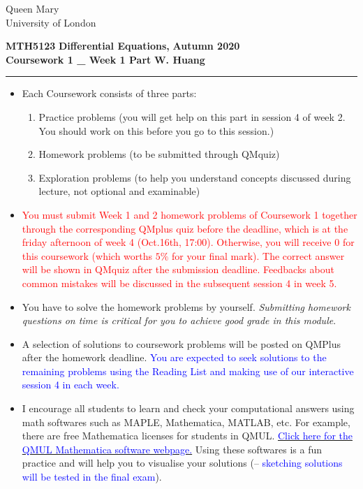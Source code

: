 \documentclass[11pt,a4paper,twoside]{article}
\begin{document}
	\begin{singlespace}
		\begin{center}
			\Huge Queen Mary\\
			\LARGE University of London
		\end{center}
		\Large \textbf{MTH5123} \hfill \Large \textbf{Differential Equations,} \hfill \Large \textbf{Autumn 2020}\\
		\large \textbf{Coursework 1 \_ Week 1 Part} \hfill \large \textbf{W. Huang}
	\end{singlespace}
	\rule{\textwidth}{0.4pt}
	\begin{itemize}
		\item Each Coursework consists of three parts:
		\begin{enumerate}[\bfseries I.]
			\item Practice problems (you will get help on this part in session 4 of week 2. You should work on this before you go to this session.)
			\item Homework problems (to be submitted through QMquiz)
			\item Exploration problems (to help you understand concepts discussed during lecture, not optional and examinable)
		\end{enumerate}
		\item \textcolor{red}{You must submit Week 1 and 2 homework problems of Coursework 1 together through the corresponding QMplus quiz before the deadline, which is at the friday afternoon of week 4 (Oct.16th, 17:00). Otherwise, you will receive 0 for this coursework (which worths $5\%$ for your final mark). The correct answer will be shown in QMquiz after the submission deadline. Feedbacks about common mistakes will be discussed in the subsequent session 4 in week 5.}
		\item You have to solve the homework problems by yourself. \textit{Submitting homework questions on time is critical for you to achieve good grade in this module}.
		\item A selection of solutions to coursework problems will be posted on QMPlus after the homework deadline. \textcolor{blue}{You are expected to seek solutions to the remaining problems using the Reading List and making use of our interactive session 4 in each week.}
		\item I encourage all students to learn and check your computational answers using math softwares such as MAPLE, Mathematica, MATLAB, etc. For example, there are free Mathematica licenses for students in QMUL. \href{https://www.its.qmul.ac.uk/services/service-catalogue/items/software---computational-mathematica.html}{\textcolor{blue}{Click here for the QMUL Mathematica software webpage.}} Using these softwares is a fun practice and will help you to visualise your solutions (– \textcolor{blue}{sketching solutions will be tested in the final exam}).
	\end{itemize}
\end{document}
